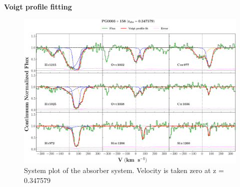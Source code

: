{}\begin{frame}{\huge{{\textbf{Voigt profile fitting}}}}\markdownRendererInterblockSeparator
{}\end{frame}\markdownRendererInterblockSeparator
{}%
{}%
{}%
{}\begin{frame}{}\markdownRendererInterblockSeparator
{}\begin{figure}[!htbp] \centering \includegraphics[width=12cm]{Figures/Mid-term/PG0003+158-z=0.347579-sys-plot.png} \vspace*{-1mm} \caption{System plot of the absorber system. Velocity is taken zero at z = 0.347579} \end{figure}\markdownRendererInterblockSeparator
{}\end{frame}\markdownRendererInterblockSeparator
